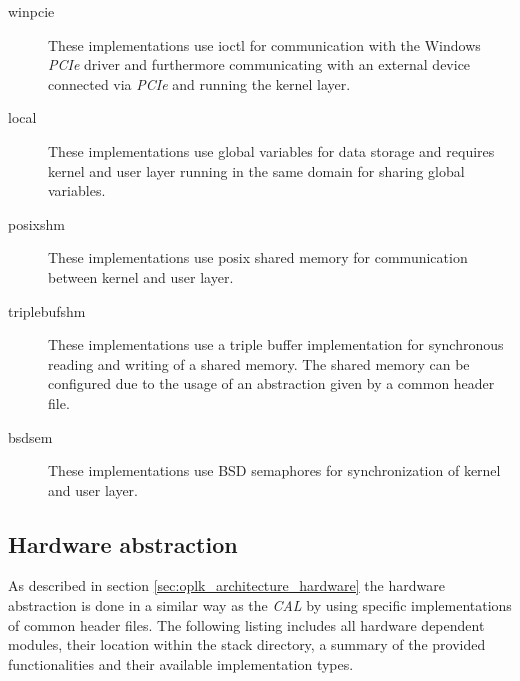 \begin{description}
    \item[winpcie] These implementations use ioctl for communication with the Windows \emph{PCIe} driver and furthermore communicating with an external device connected via \emph{PCIe} and running the kernel layer.
    \item[local] These implementations use global variables for data storage and requires kernel and user layer running in the same domain for sharing global variables.
    \item[posixshm] These implementations use posix shared memory for communication between kernel and user layer.
    \item[triplebufshm] These implementations use a triple buffer implementation for synchronous reading and writing of a shared memory.
    The shared memory can be configured due to the usage of an abstraction given by a common header file.
    \item[bsdsem] These implementations use BSD semaphores for synchronization of kernel and user layer.
\end{description}



\subsection{Hardware abstraction}
\label{sec:oplk_platform_hardware}

As described in section \ref{sec:oplk_architecture_hardware} the hardware abstraction is done in a similar way as the \emph{CAL} by using specific implementations of common header files.
The following listing includes all hardware dependent modules, their location within the stack directory, a summary of the provided functionalities and their available implementation types.

